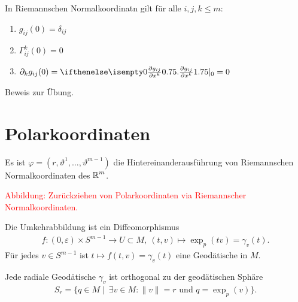 \begin{Prop}
  In Riemannschen Normalkoordinatn gilt für alle $i,j,k \leq m$:
  \begin{enumerate}[label=(\roman*)]
  \item $g_{ij}(0) = \delta_{ij}$
  \item $\Gamma^k_{ij}(0) = 0$
  \item $\partial_k g_{ij}(0) = \pdifffrac[0]{g_{ij}}{x^k} = 0$
  \end{enumerate}
\end{Prop}

Beweis zur Übung.

\section{Polarkoordinaten}

Es ist $\varphi = (r, \vartheta^1, \ldots, \vartheta^{m-1})$ die Hintereinanderausführung von Riemannschen Normalkoordinaten des $\operatorname{\mathbb{R}}^m$.

\begin{center}
  \textcolor{red}{Abbildung: Zurückziehen von Polarkoordinaten via Riemannscher Normalkoordinaten.}
\end{center}

Die Umkehrabbildung ist ein Diffeomorphismus
\begin{align*}
  f \colon (0, \varepsilon) \times S^{m-1} \to U \subset M, \ 
  (t,v) \mapsto \exp_p(tv) = \gamma_v(t).
\end{align*}
Für jedes $v \in S^{m-1}$ ist $t \mapsto f(t,v) = \gamma_v(t)$ eine Geodätische in $M$.

\begin{Lemma}
  Jede radiale Geodätische $\gamma_v$ ist orthogonal zu der geodätischen Sphäre
  \begin{align*}
    S_r = \{q \in M \mid \ \exists v \in M: \|v\| = r \text{ und } q = \exp_p(v) \}.
  \end{align*}
\end{Lemma}

